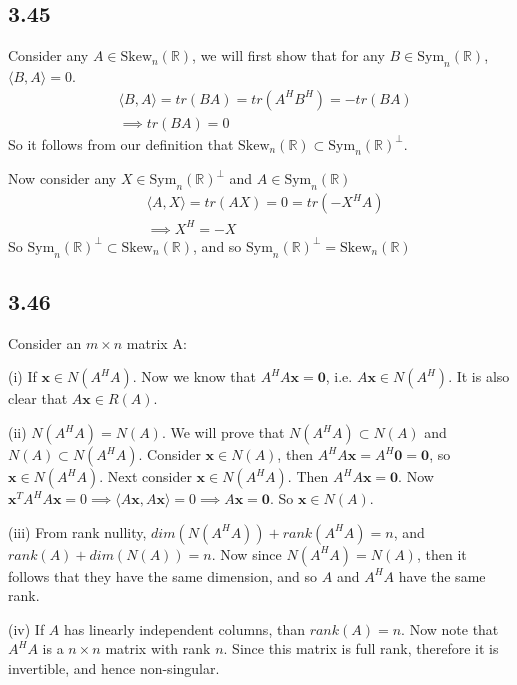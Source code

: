 \documentclass{article}
\newcommand{\inprod}[1]{\langle #1 \rangle}
\begin{document}
	\subsection*{3.45}
	Consider any $A \in \text{Skew}_n(\mathbb{R})$, we will first show that for any $B \in \text{Sym}_n(\mathbb{R})$, $\inprod{B,A} = 0$. 
	\begin{align*}
	&\inprod{B,A} = tr(BA) = tr(A^H B^H) = -tr(B A) \\
	&\implies tr(BA) = 0
	\end{align*}
	So it follows from our definition that $\text{Skew}_n(\mathbb{R}) \subset \text{Sym}_n(\mathbb{R})^{\perp}$. 
	
	Now consider any $X \in \text{Sym}_n(\mathbb{R})^{\perp}$ and $A \in \text{Sym}_n(\mathbb{R})$
	\begin{align*}
	&\inprod{A, X} = tr(AX) = 0 =  tr(-X^HA) \\
	&\implies X^H = -X
	\end{align*}
	So $\text{Sym}_n(\mathbb{R})^{\perp} \subset \text{Skew}_n(\mathbb{R})$, and so $\text{Sym}_n(\mathbb{R})^{\perp} = \text{Skew}_n(\mathbb{R})$ 
	
	\subsection*{3.46}
	Consider an $m \times n$ matrix A:
	
	(i) If $\mathbf{x} \in N(A^H A)$. Now we know that $A^H A \mathbf{x} = \mathbf{0}$, i.e. $A \mathbf{x} \in N(A^H)$. It is also clear that $A \mathbf{x} \in R(A)$.
	
	(ii) $N(A^HA) = N(A)$. We will prove that $N(A^HA) \subset N(A)$ and $N(A) \subset N(A^HA)$. Consider $\mathbf{x} \in N(A)$, then $A^H A \mathbf{x} = A^H \mathbf{0} = \mathbf{0}$, so $\mathbf{x} \in N(A^HA)$. Next consider $\mathbf{x} \in N(A^H A)$. Then $A^H A \mathbf{x} = \mathbf{0}$. Now $\mathbf{x}^T A^H A \mathbf{x} = 0 \implies \inprod{A \mathbf{x} , A \mathbf{x}} = 0 \implies A \mathbf{x} = \mathbf{0}$. So $\mathbf{x} \in N(A)$. 
	
	(iii) From rank nullity, $dim(N(A^H A)) + rank(A^H A) = n$, and $rank(A) + dim(N(A)) = n$. Now since $N(A^H A) = N(A)$, then it follows that they have the same dimension, and so $A$ and $A^HA$ have the same rank.
	
	(iv) If $A$ has linearly independent columns, than $rank(A) = n$. Now note that $A^HA$ is a $n \times n$ matrix with rank $n$. Since this matrix is full rank, therefore it is invertible, and hence non-singular.
	
\end{document}
